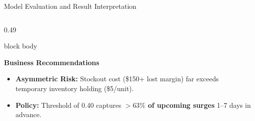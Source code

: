 \documentclass[aspectratio=169, 10pt]{beamer}
\newenvironment{card}[1][]{%
    \begin{beamercolorbox}[rounded=true,shadow=false,wd=\linewidth,sep=4pt,#1]{block body}%
}{%
    \end{beamercolorbox}%
}
\begin{document}
\begin{frame}{Model Evaluation and Result Interpretation}
\begin{columns}[T]
        \begin{column}{0.49\textwidth}
            \begin{card}
                {\fontsize{8.5pt}{10pt}\selectfont \textbf{\color{EmeraldGreen}Business Recommendations}}\\[0.06cm]
                \begin{itemize}\setlength{\itemsep}{1.5pt}
                    \item \textbf{Asymmetric Risk:} Stockout cost (\$150+ lost margin) far exceeds temporary inventory holding (\$5/unit).
                    \item \textbf{Policy:} Threshold of 0.40 captures \textbf{$>63\%$ of upcoming surges} 1--7 days in advance.
                \end{itemize}
            \end{card}
        \end{column}
    \end{columns}
\end{frame}
\end{document}
